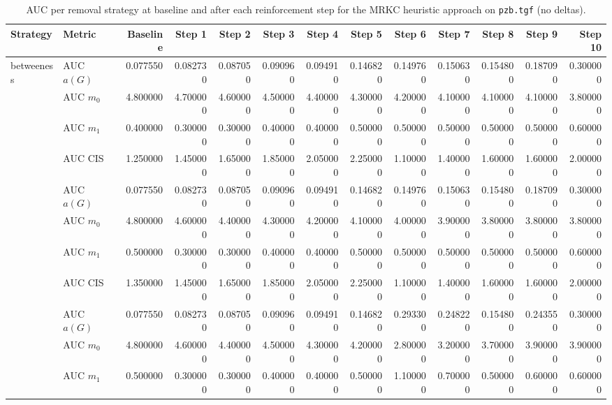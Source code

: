 \begin{table}[htbp]
  \centering
  \caption{AUC per removal strategy at baseline and after each reinforcement step for the MRKC heuristic approach on \texttt{pzb.tgf} (no deltas).}
  \label{tab:pzb-mrkc_heuristic-auc}
\setlength{\tabcolsep}{2.5pt}
  \begin{tabular}{llrrrrrrrrrrr}
    \toprule
    \textbf{Strategy} & \textbf{Metric} & \textbf{Baseline} & \textbf{Step 1} & \textbf{Step 2} & \textbf{Step 3} & \textbf{Step 4} & \textbf{Step 5} & \textbf{Step 6} & \textbf{Step 7} & \textbf{Step 8} & \textbf{Step 9} & \textbf{Step 10} \\
    \midrule
    \multirow{4}{*}{betweeness} & AUC $a(G)$ & 0.077550 & 0.082730 & 0.087050 & 0.090960 & 0.094910 & 0.146820 & 0.149760 & 0.150630 & 0.154800 & 0.187090 & 0.300000 \\
    & AUC $m_0$ & 4.800000 & 4.700000 & 4.600000 & 4.500000 & 4.400000 & 4.300000 & 4.200000 & 4.100000 & 4.100000 & 4.100000 & 3.800000 \\
    & AUC $m_1$ & 0.400000 & 0.300000 & 0.300000 & 0.400000 & 0.400000 & 0.500000 & 0.500000 & 0.500000 & 0.500000 & 0.500000 & 0.600000 \\
    & AUC CIS & 1.250000 & 1.450000 & 1.650000 & 1.850000 & 2.050000 & 2.250000 & 1.100000 & 1.400000 & 1.600000 & 1.600000 & 2.000000 \\
    \addlinespace
    \multirow{4}{*}{closeness} & AUC $a(G)$ & 0.077550 & 0.082730 & 0.087050 & 0.090960 & 0.094910 & 0.146820 & 0.149760 & 0.150630 & 0.154800 & 0.187090 & 0.300000 \\
    & AUC $m_0$ & 4.800000 & 4.600000 & 4.400000 & 4.300000 & 4.200000 & 4.100000 & 4.000000 & 3.900000 & 3.800000 & 3.800000 & 3.800000 \\
    & AUC $m_1$ & 0.500000 & 0.300000 & 0.300000 & 0.400000 & 0.400000 & 0.500000 & 0.500000 & 0.500000 & 0.500000 & 0.500000 & 0.600000 \\
    & AUC CIS & 1.350000 & 1.450000 & 1.650000 & 1.850000 & 2.050000 & 2.250000 & 1.100000 & 1.400000 & 1.600000 & 1.600000 & 2.000000 \\
    \addlinespace
    \multirow{4}{*}{core influence} & AUC $a(G)$ & 0.077550 & 0.082730 & 0.087050 & 0.090960 & 0.094910 & 0.146820 & 0.293300 & 0.248220 & 0.154800 & 0.243550 & 0.300000 \\
    & AUC $m_0$ & 4.800000 & 4.600000 & 4.400000 & 4.500000 & 4.300000 & 4.200000 & 2.800000 & 3.200000 & 3.700000 & 3.900000 & 3.900000 \\
    & AUC $m_1$ & 0.500000 & 0.300000 & 0.300000 & 0.400000 & 0.400000 & 0.500000 & 1.100000 & 0.700000 & 0.500000 & 0.600000 & 0.600000 \\

\end{tabular}
\end{table}
